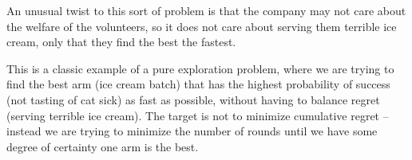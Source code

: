 An unusual twist to this sort of problem is that the company may not care about the welfare of the volunteers, so it does not care about serving them terrible ice cream, only that they find the best the fastest.

This is a classic example of a pure exploration problem, where we are trying to find the best arm (ice cream batch) that has the highest probability of success (not tasting of cat sick) as fast as possible, without having to balance regret (serving terrible ice cream). The target is not to minimize cumulative regret – instead we are trying to minimize the number of rounds until we have some degree of certainty one arm is the best.


